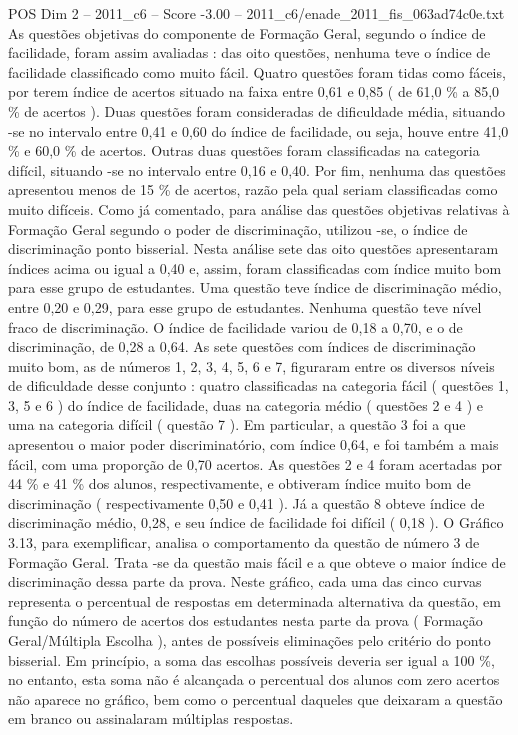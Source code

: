 \begin{textsample}{POS Dim 2 – 2011\_c6 – Score -3.00 – 2011\_c6/enade\_2011\_fis\_063ad74c0e.txt}
As questões objetivas do componente de Formação Geral, segundo o índice de facilidade, foram assim avaliadas : das oito questões, nenhuma teve o índice de facilidade classificado como muito fácil.
Quatro questões foram tidas como fáceis, por terem índice de acertos situado na faixa entre 0,61 e 0,85 ( de 61,0 \% a 85,0 \% de acertos ).
Duas questões foram consideradas de dificuldade média, situando -se no intervalo entre 0,41 e 0,60 do índice de facilidade, ou seja, houve entre 41,0 \% e 60,0 \% de acertos.
Outras duas questões foram classificadas na categoria difícil, situando -se no intervalo entre 0,16 e 0,40.
Por fim, nenhuma das questões apresentou menos de 15 \% de acertos, razão pela qual seriam classificadas como muito difíceis.
Como já comentado, para análise das questões objetivas relativas à Formação Geral segundo o poder de discriminação, utilizou -se, o índice de discriminação ponto bisserial.
Nesta análise sete das oito questões apresentaram índices acima ou igual a 0,40 e, assim, foram classificadas com índice muito bom para esse grupo de estudantes.
Uma questão teve índice de discriminação médio, entre 0,20 e 0,29, para esse grupo de estudantes.
Nenhuma questão teve nível fraco de discriminação.
O índice de facilidade variou de 0,18 a 0,70, e o de discriminação, de 0,28 a 0,64.
As sete questões com índices de discriminação muito bom, as de números 1, 2, 3, 4, 5, 6 e 7, figuraram entre os diversos níveis de dificuldade desse conjunto : quatro classificadas na categoria fácil ( questões 1, 3, 5 e 6 ) do índice de facilidade, duas na categoria médio ( questões 2 e 4 ) e uma na categoria difícil ( questão 7 ).
Em particular, a questão 3 foi a que apresentou o maior poder discriminatório, com índice 0,64, e foi também a mais fácil, com uma proporção de 0,70 acertos.
As questões 2 e 4 foram acertadas por 44 \% e 41 \% dos alunos, respectivamente, e obtiveram índice muito bom de discriminação ( respectivamente 0,50 e 0,41 ).
Já a questão 8 obteve índice de discriminação médio, 0,28, e seu índice de facilidade foi difícil ( 0,18 ).
O Gráfico 3.13, para exemplificar, analisa o comportamento da questão de número 3 de Formação Geral.
Trata -se da questão mais fácil e a que obteve o maior índice de discriminação dessa parte da prova.
Neste gráfico, cada uma das cinco curvas representa o percentual de respostas em determinada alternativa da questão, em função do número de acertos dos estudantes nesta parte da prova ( Formação Geral/Múltipla Escolha ), antes de possíveis eliminações pelo critério do ponto bisserial.
Em princípio, a soma das escolhas possíveis deveria ser igual a 100 \%, no entanto, esta soma não é alcançada o percentual dos alunos com zero acertos não aparece no gráfico, bem como o percentual daqueles que deixaram a questão em branco ou assinalaram múltiplas respostas.

\end{textsample}
